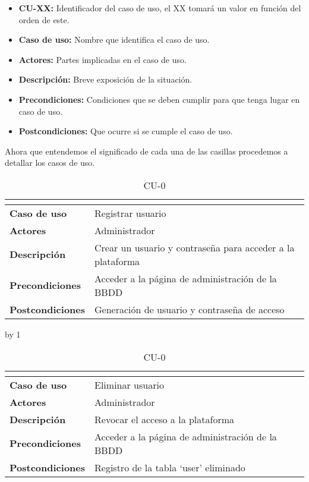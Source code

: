 \begin{itemize}
	\item \textbf{CU-XX:} Identificador del caso de uso, el XX tomará un valor en función del orden de este.
	\item \textbf{Caso de uso:} Nombre que identifica el caso de uso.
	\item \textbf{Actores:} Partes implicadas en el caso de uso.
	\item \textbf{Descripción:} Breve exposición de la situación.
	\item \textbf{Precondiciones:} Condiciones que se deben cumplir para que tenga lugar en caso de uso.
	\item \textbf{Postcondiciones:} Que ocurre si se cumple el caso de uso.
\end{itemize}

Ahora que entendemos el significado de cada una de las casillas procedemos a detallar los casos de uso.
\newcount\cu
{}
\begin{table}[H]
	\centering
	\caption{CU-0\number\cu}
	\begin{tabular}{|l|l|}
		\hline
		\multicolumn{2}{|c|}{\cellcolor[HTML]{BFBFBF}{\color[HTML]{000000} \textbf{CU-0\number\cu}}} \\ \hline
		\textbf{Caso de uso}     & Registrar usuario                                          \\ \hline
		\textbf{Actores}         & Administrador                                              \\ \hline
		\textbf{Descripción}     & Crear un usuario y contraseña para acceder a la plataforma \\ \hline
		\textbf{Precondiciones}  & Acceder a la página de administración de la BBDD           \\ \hline
		\textbf{Postcondiciones} & Generación de usuario y contraseña de acceso               \\ \hline
	\end{tabular}
\end{table}
\advance\cu by 1
\begin{table}[H]
	\centering
	\caption{CU-0\number\cu}
	\begin{tabular}{|l|l|}
		\hline
		\multicolumn{2}{|c|}{\cellcolor[HTML]{BFBFBF}{\color[HTML]{000000} \textbf{CU-0\number\cu}}} \\ \hline
		\textbf{Caso de uso}     & Eliminar usuario                                 \\ \hline
		\textbf{Actores}         & Administrador                                    \\ \hline
		\textbf{Descripción}     & Revocar el acceso a la plataforma                \\ \hline
		\textbf{Precondiciones}  & Acceder a la página de administración de la BBDD \\ \hline
		\textbf{Postcondiciones} & Registro de la tabla ‘user’ eliminado            \\ \hline
	\end{tabular}
\end{table}
